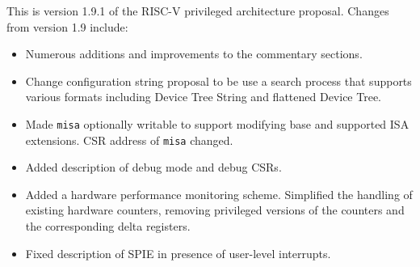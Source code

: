 This is version 1.9.1 of the RISC-V privileged architecture
proposal.  Changes from version 1.9 include:

\begin{itemize}
  \parskip 0pt
  \itemsep 1pt
\item Numerous additions and improvements to the commentary sections.
\item Change configuration string proposal to be use a search process
  that supports various formats including Device Tree String and
  flattened Device Tree.
\item Made {\tt misa} optionally writable to support modifying base
  and supported ISA extensions.  CSR address of {\tt misa} changed.
\item Added description of debug mode and debug CSRs.
\item Added a hardware performance monitoring scheme.  Simplified the
  handling of existing hardware counters, removing privileged versions
  of the counters and the corresponding delta registers.
\item Fixed description of SPIE in presence of user-level interrupts.
\end{itemize}
